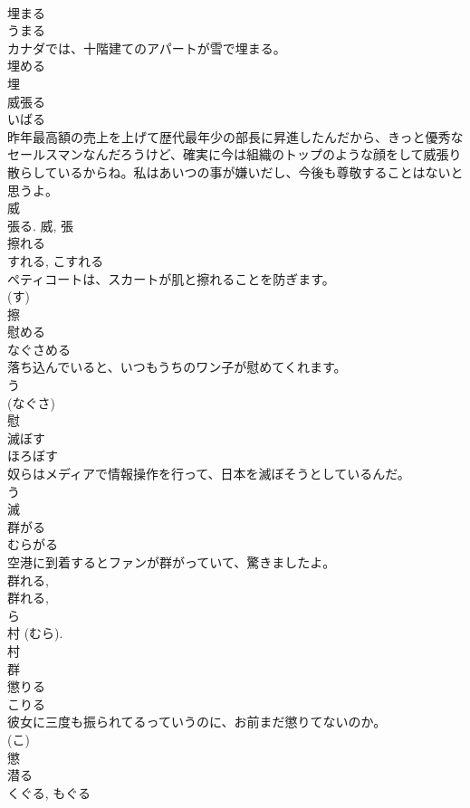 \documentclass[8pt]{extreport}
\begin{document}
\begin{CJK}{UTF8}{min}
\\	埋まる	
\\	うまる	
\\	カナダでは、十階建てのアパートが雪で埋まる。	
\\	埋める 
\\	埋	
\\	威張る	
\\	いばる	
\\	昨年最高額の売上を上げて歴代最年少の部長に昇進したんだから、きっと優秀なセールスマンなんだろうけど、確実に今は組織のトップのような顔をして威張り散らしているからね。私はあいつの事が嫌いだし、今後も尊敬することはないと思うよ。	
\\	威 
\\	張る.	威, 張	
\\	擦れる	
\\	すれる, こすれる	
\\	ペティコートは、スカートが肌と擦れることを防ぎます。	
\\	(す) 
\\	擦	
\\	慰める	
\\	なぐさめる	
\\	落ち込んでいると、いつもうちのワン子が慰めてくれます。	
\\	う 
\\	(なぐさ) 
\\	慰	
\\	滅ぼす	
\\	ほろぼす	
\\	奴らはメディアで情報操作を行って、日本を滅ぼそうとしているんだ。	
\\	う 
\\	滅	
\\	群がる	
\\	むらがる	
\\	空港に到着するとファンが群がっていて、驚きましたよ。	
\\	群れる, 
\\	群れる, 
\\	ら 
\\	村 (むら). 
\\	村 
\\	群	
\\	懲りる	
\\	こりる	
\\	彼女に三度も振られてるっていうのに、お前まだ懲りてないのか。	
\\	(こ) 
\\	懲	
\\	潜る	
\\	くぐる, もぐる	

\end{CJK}
\end{document}
